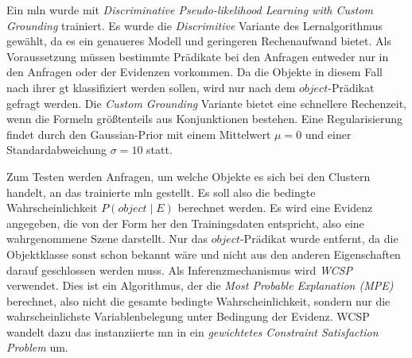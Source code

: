 Ein \gls{mln} wurde mit \textit{Discriminative Pseudo-likelihood Learning with Custom Grounding} trainiert. Es wurde die \textit{Discrimitive} Variante des Lernalgorithmus gewählt, da es ein genaueres Modell und geringeren Rechenaufwand bietet. Als Voraussetzung müssen bestimmte Prädikate bei den Anfragen entweder nur in den Anfragen oder der Evidenzen vorkommen. Da die Objekte in diesem Fall nach ihrer \gls{gt} klassifiziert werden sollen, wird nur nach dem $object$-Prädikat gefragt werden. Die \textit{Custom Grounding} Variante bietet eine schnellere Rechenzeit, wenn die Formeln größtenteils aus Konjunktionen bestehen. Eine Regularisierung findet durch den Gaussian-Prior mit einem Mittelwert $\mu = 0$ und einer Standardabweichung $\sigma = 10$ statt. \par   

Zum Testen werden Anfragen, um welche Objekte es sich bei den Clustern handelt, an das trainierte \gls{mln} gestellt. Es soll also die bedingte Wahrscheinlichkeit $P(object \mid E)$ berechnet werden. Es wird eine Evidenz angegeben, die von der Form her den Trainingsdaten entspricht, also eine wahrgenommene Szene darstellt. Nur das $object$-Prädikat wurde entfernt, da die Objektklasse sonst schon bekannt wäre und nicht aus den anderen Eigenschaften darauf geschlossen werden muss. Als Inferenzmechanismus wird \textit{WCSP} verwendet. Dies ist ein Algorithmus, der die \textit{Most Probable Explanation (MPE)} berechnet, also nicht die gesamte bedingte Wahrscheinlichkeit, sondern nur die wahrscheinlichste Variablenbelegung unter Bedingung der Evidenz. WCSP wandelt dazu das instanziierte \gls{mn} in ein \textit{gewichtetes Constraint Satisfaction Problem} um. \par

